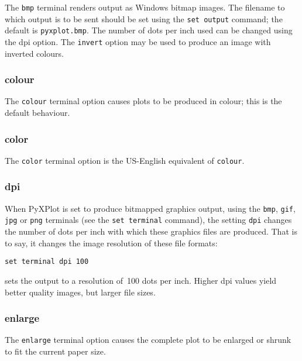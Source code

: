 The {\tt bmp} terminal renders output as Windows bitmap images. The filename to
which output is to be sent should be set using the {\tt set output} command;
the default is {\tt pyxplot.bmp}. The number of dots per inch used can be
changed using the dpi option. The {\tt invert} option may be used to produce an
image with inverted colours.


\subsubsection{colour}

The {\tt colour} terminal option causes plots to be produced in colour; this is
the default behaviour.


\subsubsection{color}

The {\tt color} terminal option is the US-English equivalent of {\tt colour}.


\subsubsection{dpi}

When PyXPlot is set to produce bitmapped graphics output, using the {\tt bmp},
{\tt gif}, {\tt jpg} or {\tt png} terminals (see the {\tt set terminal}
command), the setting {\tt dpi} changes the number of dots per inch with which
these graphics files are produced. That is to say, it changes the image
resolution of these file formats:

\begin{verbatim}
set terminal dpi 100
\end{verbatim}

\noindent sets the output to a resolution of~100 dots per inch. Higher dpi
values yield better quality images, but larger file sizes.


\subsubsection{enlarge}

The {\tt enlarge} terminal option causes the complete plot to be enlarged or
shrunk to fit the current paper size.


